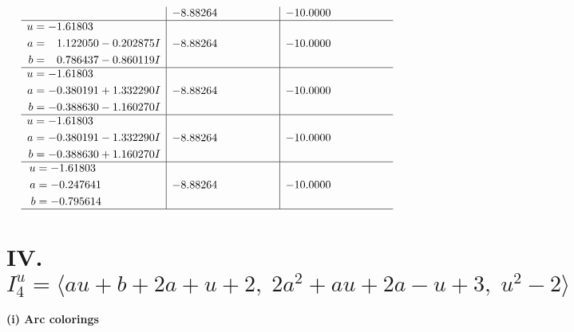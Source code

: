 \documentclass[1p]{elsarticle_modified}
\theoremstyle{definition}
\begin{document}
$$\begin{array}{c|c|c}
 & -8.88264\phantom{ +0.000000I} & -10.0000\phantom{ +0.000000I} \\ \hline\begin{aligned}
u &= -1.61803\phantom{ +0.000000I} \\
a &= \phantom{-}1.122050 - 0.202875 I \\
b &= \phantom{-}0.786437 - 0.860119 I\end{aligned}
 & -8.88264\phantom{ +0.000000I} & -10.0000\phantom{ +0.000000I} \\ \hline\begin{aligned}
u &= -1.61803\phantom{ +0.000000I} \\
a &= -0.380191 + 1.332290 I \\
b &= -0.388630 - 1.160270 I\end{aligned}
 & -8.88264\phantom{ +0.000000I} & -10.0000\phantom{ +0.000000I} \\ \hline\begin{aligned}
u &= -1.61803\phantom{ +0.000000I} \\
a &= -0.380191 - 1.332290 I \\
b &= -0.388630 + 1.160270 I\end{aligned}
 & -8.88264\phantom{ +0.000000I} & -10.0000\phantom{ +0.000000I} \\ \hline\begin{aligned}
u &= -1.61803\phantom{ +0.000000I} \\
a &= -0.247641\phantom{ +0.000000I} \\
b &= -0.795614\phantom{ +0.000000I}\end{aligned}
 & -8.88264\phantom{ +0.000000I} & -10.0000\phantom{ +0.000000I}\\
 \hline 
 \end{array}$$\newpage\newpage\renewcommand{\arraystretch}{1}
\centering \section*{IV. $I^u_{4}= \langle a u+b+2 a+u+2,\;2 a^2+a u+2 a- u+3,\;u^2-2 \rangle$}
\flushleft \textbf{(i) Arc colorings}\\
\end{document}
